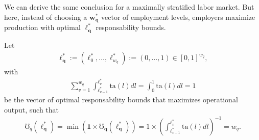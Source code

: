 \documentclass[hidelinks, nonatbib]{elsarticle}
\begin{document}
\begin{enumerate}

    We can derive the same conclusion for a maximally stratified labor market. But here, instead of choosing a $\boldsymbol{w_{q}^{*}}$ vector of employment levels, employers maximize production with optimal $\boldsymbol{\ell_{q}^{*}}$ responsability bounds.

    Let 
    \begin{gather}
        \boldsymbol{\ell_{q}^{*}}
        :=
        (\ell_{0}^{*}, \dots, \ell_{w_q}^{*})
        :=
        (0, \dots, 1) 
        \in [0,1]^{w_q}
        ,
    \end{gather}
    with
    \begin{gather}
    \sum_{v=1}^{w_q}
    \int_{
        \ell_{v-1}^{*}
    }^{
        \ell_{v}^{*}
    }
    \text{ta}(l)dl
    =
    \int_{0}^{1}
    \text{ta}(l)dl
    =
    1
    \end{gather}
    be the vector of optimal responsability bounds that maximizes operational output, such that
    \begin{gather}
        \mho_{q}(\boldsymbol{\ell_{q}^{*}})
        =
        \min(
            \boldsymbol{1}
            \times
            \boldsymbol{\mho_q}(
                \boldsymbol{\ell_{q}^{*}}
            )
        )
        =
        1
        \times
        \left(
            \int_{
                \ell_{v-1}^{*}
            }^{
                \ell_{v}^{*}
            }
            \text{ta}(l)dl
        \right) ^ {-1}
        =
        w_q
        .
    \end{gather}


\end{enumerate}
\end{document}
